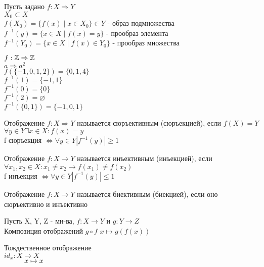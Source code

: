 \begin{definition}
Пусть задано $ f : X \Rightarrow Y $ \\
$ X_0 \subset X $ \\
$ f(X_0) = \{ f(x) \mid x \in X_0 \} \in Y $ - образ подмножества \\
$ f^{-1}(y) = \{ x \in  X \mid f(x) = y \} $ - прообраз элемента \\
$ f^{-1}(Y_0) = \{ x \in X \mid f(x) \in Y_0 \} $  - прообраз множества 
\begin{example}
	$ f: \mathbb{Z} \Rightarrow \mathbb{Z} $ \\
	$ a \Rightarrow a^2 $ \\
	$ f( \{ -1, 0, 1, 2 \} ) = \{ 0, 1, 4 \} $ \\
	$ f^{-1} (1)= \{-1, 1\}$ \\
    $ f^{-1} (0)= \{0\}$ \\
	$ f^{-1} (2)= \varnothing$ \\
	$ f^{-1} (\{0,1\})= \{-1, 0, 1\}$ 
\end{example}
\end{definition}



\begin{definition}
Отображение $ f: X \Rightarrow Y $ называется сюръективным (сюръекцией), если $ f(X) = Y $ $ \forall y \in Y \exists x \in X : f(x) = y $ \\
f сюръекция $ \Leftrightarrow  \forall y \in Y |f^{-1}(y)| \geq 1 $ \\
\end{definition}
\begin{definition}
Отображение $ f: X \rightarrow Y $ называется инъективным (инъекцией), если $ \forall x_1, x_2 \in X : x_1 \neq x_2 \rightarrow f(x_1) \neq f(x_2) $ \\
f инъекция $ \Leftrightarrow  \forall y \in Y |f^{-1}(y)| \leq 1 $ 
\end{definition}
\begin{definition}
Отображение $ f: X \rightarrow Y $ называется биективным (биекцией), если оно сюръективно и инъективно 
\end{definition}

\begin{definition}
Пусть X, Y, Z - мн-ва, $f: X \rightarrow Y $ и $ g: Y \rightarrow Z $ \\
Композиция отображений $ g \circ f $ $ x \mapsto g(f(x)) $ 
\end{definition}

\begin{definition}
Тождественное отображение \\$ id_x : X \rightarrow X $ \\
$\hspace*{10mm} x \mapsto x $
\end{definition}

